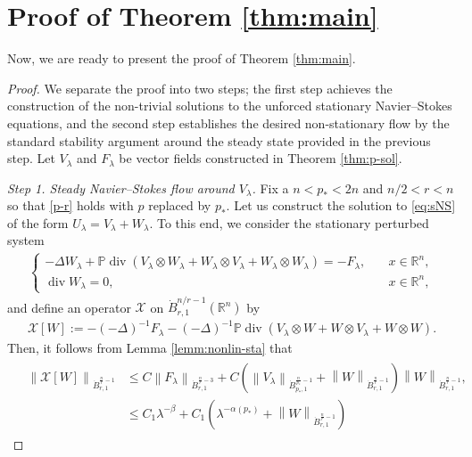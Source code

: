 \documentclass[a4paper,12pt,reqno]{amsart}
\theoremstyle{plain}
\theoremstyle{definition}
\renewcommand{\div}{\operatorname{div}}
\newcommand{\dB}{\dot{B}}
\renewcommand{\leq}{\leqslant}
\newcommand{\n}[1]{{\left\|#1\right\|}}
\newcommand{\R}{\mathbb{R}}
\renewcommand{\sp}[1]{\left(#1\right)}
\begin{document}
\section{Proof of Theorem \ref{thm:main}}\label{sec:pf}
Now, we are ready to present the proof of Theorem \ref{thm:main}.
\begin{proof}
We separate the proof into two steps; the first step achieves the construction of the non-trivial solutions to the unforced stationary Navier--Stokes equations, and the second step establishes the desired non-stationary flow by the standard stability argument around the steady state provided in the previous step.
Let $V_\lambda$ and $F_{\lambda}$ be vector fields constructed in Theorem \ref{thm:p-sol}.
%

\noindent
{\it Step 1. Steady Navier--Stokes flow around $V_{\lambda}$.}
%
Fix a $n<p_*<2n$ and $n/2<r<n$ so that \eqref{p-r} holds with $p$ replaced by $p_*$. 
Let us construct the solution to \eqref{eq:sNS} of the form $U_{\lambda}=V_{\lambda}+W_{\lambda}$.
To this end, we consider the stationary perturbed system
\begin{align}\label{eq:W}
    \begin{cases}
        -\Delta W_{\lambda} + \mathbb{P}\div \sp{V_{\lambda} \otimes W_{\lambda} + W_{\lambda} \otimes V_{\lambda} + W_{\lambda} \otimes W_{\lambda}} = - F_{\lambda}, \quad & x \in \R^n, \\
        \div W_{\lambda} = 0, \quad & x \in \R^n,
    \end{cases}
\end{align}
and define an operator $\mathcal{X}$ on $\dB_{r,1}^{n/r-1}(\R^n)$ by
\begin{align}
    \mathcal{X}[W]
    := - (-\Delta)^{-1}F_{\lambda} - (-\Delta)^{-1}\mathbb{P}\div \sp{V_{\lambda} \otimes W + W \otimes V_{\lambda}+ W \otimes W}.
\end{align}
Then, it follows from Lemma \ref{lemm:nonlin-sta} that 
\begin{align}
    &
    \begin{aligned}
    \n{\mathcal{X}[W]}_{\dB_{r,1}^{\frac{n}{r}-1}}
    &
    \leq 
    C
    \n{F_{\lambda}}_{\dB_{r,1}^{\frac{n}{r}-3}}
    +
    C
    \sp{
    \n{V_{\lambda}}_{\dB_{p_*,1}^{\frac{n}{p_*}-1}}
    +
    \n{W}_{\dB_{r,1}^{\frac{n}{r}-1}}
    }
    \n{W}_{\dB_{r,1}^{\frac{n}{r}-1}},
    \\
    &
    \leq 
    C_1
    \lambda^{-\beta}
    +
    C_1
    \sp{
    \lambda^{-\alpha(p_*)}
    +
    \n{W}_{\dB_{r,1}^{\frac{n}{r}-1}}
}
\end{aligned}
\end{align}
\end{proof}
\end{document}
